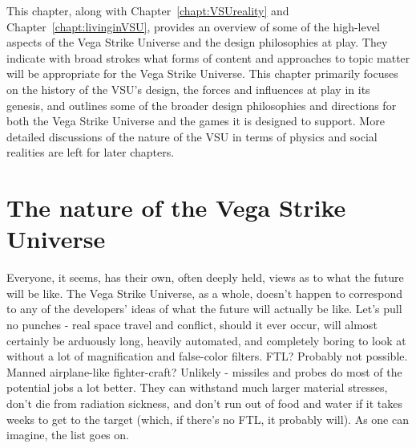 \label{chapt:overview}
This chapter, along with Chapter~\ref{chapt:VSUreality} and
Chapter~\ref{chapt:livinginVSU}, provides an overview of some of the
high-level aspects of the Vega Strike Universe and the design
philosophies at play. They indicate with broad strokes what forms of
content and approaches to topic matter will be appropriate for the
Vega Strike Universe. This chapter primarily focuses on the history of
the VSU's design, the forces and influences at play in its genesis,
and outlines some of the broader design philosophies and directions
for both the Vega Strike Universe and the games it is designed to
support. More detailed discussions of the nature of the VSU in terms
of physics and social realities are left for later chapters.


\section{The nature of the Vega Strike Universe}
\label{sec:VSUflavor}
Everyone, it seems, has their own, often deeply held, views as to what
the future will be like. The Vega Strike Universe, as a whole, doesn't
happen to correspond to any of the developers' ideas of what the future
will actually be like. Let's pull no punches - real space travel and
conflict, should it ever occur, will almost certainly be arduously
long, heavily automated, and completely boring to look at without a
lot of magnification and false-color filters. FTL? Probably not
possible. Manned airplane-like fighter-craft? Unlikely - missiles and
probes do most of the potential jobs a lot better. They can withstand much
larger material stresses, don't die from radiation sickness, and don't run
out of food and water if it takes weeks to get to the target (which,
if there's no FTL, it probably will). As one can imagine, the list goes
on.

